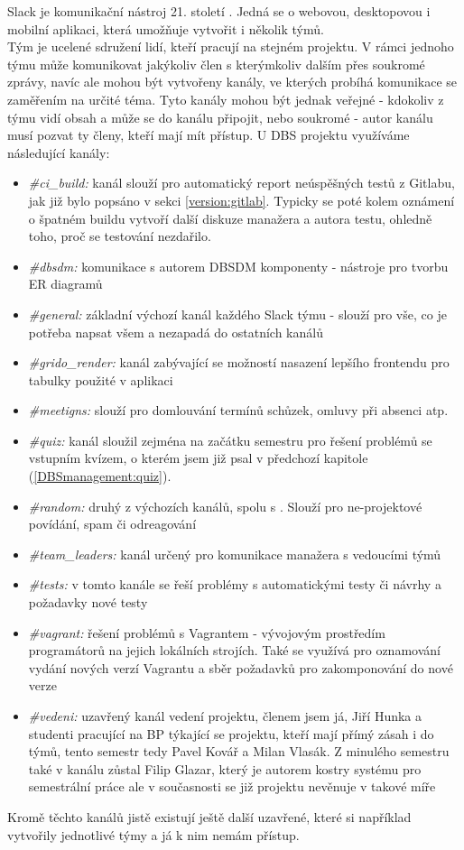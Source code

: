 Slack je komunikační nástroj 21. století \cite{slack}. Jedná se o webovou, desktopovou i mobilní aplikaci, která umožňuje vytvořit i několik týmů.\\
Tým je ucelené sdružení lidí, kteří pracují na stejném projektu. V rámci jednoho týmu může komunikovat jakýkoliv člen s kterýmkoliv dalším přes soukromé zprávy, navíc ale mohou být vytvořeny kanály, ve kterých probíhá komunikace se zaměřením na určité téma. Tyto kanály mohou být jednak veřejné - kdokoliv z týmu vidí obsah a může se do kanálu připojit, nebo soukromé - autor kanálu musí pozvat ty členy, kteří mají mít přístup. U DBS projektu využíváme následující kanály:
\begin{itemize}
	\item \emph{\#ci\_build:} kanál slouží pro automatický report neúspěšných testů z Gitlabu, jak již bylo popsáno v sekci \ref{version:gitlab}. Typicky se poté kolem oznámení o špatném buildu vytvoří další diskuze manažera a autora testu, ohledně toho, proč se testování nezdařilo.
	\item \emph{\#dbsdm:} komunikace s autorem DBSDM komponenty - nástroje pro tvorbu ER diagramů \cite{fedor}
	\item \emph{\#general:} základní výchozí kanál každého Slack týmu - slouží pro vše, co je potřeba napsat všem a nezapadá do ostatních kanálů
	\item \emph{\#grido\_render:} kanál zabývající se možností nasazení lepšího frontendu pro tabulky použité v aplikaci
	\item \emph{\#meetigns:} slouží pro domlouvání termínů schůzek, omluvy při absenci atp.
	\item \emph{\#quiz:} kanál sloužil zejména na začátku semestru pro řešení problémů se vstupním kvízem, o kterém jsem již psal v předchozí kapitole (\ref{DBSmanagement:quiz}).
	\item \emph{\#random:} druhý z výchozích kanálů, spolu s . Slouží pro ne-projektové povídání, spam či odreagování
	\item \emph{\#team\_leaders:} kanál určený pro komunikace manažera s vedoucími týmů
	\item \emph{\#tests:} v tomto kanále se řeší problémy s automatickými testy či návrhy a požadavky nové testy
	\item \emph{\#vagrant:} řešení problémů s Vagrantem - vývojovým prostředím programátorů na jejich lokálních strojích. Také se využívá pro oznamování vydání nových verzí Vagrantu a sběr požadavků pro zakomponování do nové verze
	\item \emph{\#vedeni:} uzavřený kanál vedení projektu, členem jsem já, Jiří Hunka a studenti pracující na BP týkající se projektu, kteří mají přímý zásah i do týmů, tento semestr tedy Pavel Kovář a Milan Vlasák. Z minulého semestru také v kanálu zůstal Filip Glazar, který je autorem kostry systému pro semestrální práce ale v současnosti se již projektu nevěnuje v takové míře
\end{itemize}
Kromě těchto kanálů jistě existují ještě další uzavřené, které si například vytvořily jednotlivé týmy a já k nim nemám přístup.

